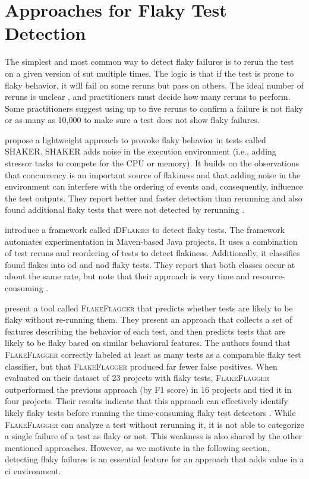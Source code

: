 \section{Approaches for Flaky Test Detection}
The simplest and most common way to detect flaky failures is to rerun the test on a given version of \ac{sut} multiple times.
The logic is that if the test is prone to flaky behavior, it will fail on some reruns but pass on others.
The ideal number of reruns is unclear \autocite{parry_survey_2021}, and practitioners must decide how many reruns to perform.
Some practitioners suggest using up to five reruns \autocite{lam_understanding_2020} to confirm a failure is not flaky or as many as 10,000 \autocite{alshammari_flakeflagger_2021} to make sure a test does not show flaky failures.

 propose a lightweight approach to provoke flaky behavior in tests called \textsc{SHAKER}.
\textsc{SHAKER} adds noise in the execution environment (i.e., adding stressor tasks to compete for the CPU or memory).
It builds on the observations that concurrency is an important source of flakiness and that adding noise in the environment can interfere with the ordering of events and, consequently, influence the test outputs.
They report better and faster detection than rerunning and also found additional flaky tests that were not detected by rerunning \autocite{silva_shake_2020}.

 introduce a framework called \textsc{iDFlakies} to detect flaky tests.
The framework automates experimentation in Maven-based Java projects.
It uses a combination of test reruns and reordering of tests to detect flakiness.
Additionally, it classifies found flakes into \ac{od} and \ac{nod} flaky tests.
They report that both classes occur at about the same rate, but note that their approach is very time and resource-consuming \autocite{lam_idflakies_2019}.

 present a tool called \textsc{FlakeFlagger} that predicts whether tests are likely to be flaky without re-running them.
They present an approach that collects a set of features describing the behavior of each test, and then predicts tests that are likely to be flaky based on similar behavioral features.
The authors found that \textsc{FlakeFlagger} correctly labeled at least as many tests as a comparable flaky test classifier, but that \textsc{FlakeFlagger} produced far fewer false positives.
When evaluated on their dataset of 23 projects with flaky tests, \textsc{FlakeFlagger} outperformed the previous approach (by F1 score) in 16 projects and tied it in four projects.
Their results indicate that this approach can effectively identify likely flaky tests before running the time-consuming flaky test detectors \autocite{alshammari_flakeflagger_2021}.
While \textsc{FlakeFlagger} can analyze a test without rerunning it, it is not able to categorize a single failure of a test as flaky or not.
This weakness is also shared by the other mentioned approaches.
However, as we motivate in the following section, detecting flaky failures is an essential feature for an approach that adds value in a \ac{ci} environment.

